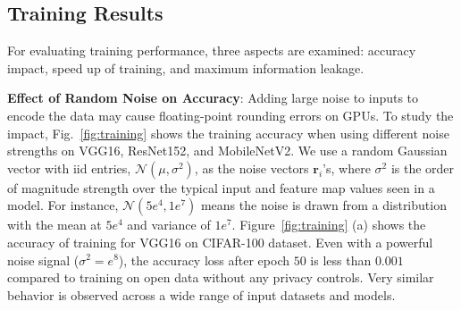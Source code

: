 \subsection{Training Results}
For evaluating training performance, three aspects are examined: accuracy impact, speed up of training, and maximum information leakage. 

\textbf{Effect of Random Noise on Accuracy}: Adding large noise to inputs to encode the data may cause floating-point rounding errors on GPUs. To study the impact, Fig.~\ref{fig:training} shows the training accuracy when using different noise strengths on VGG16, ResNet152, and MobileNetV2. 
We use a random Gaussian vector with iid entries, $\mathcal N(\mu,\sigma^2)$, as the noise vectors $\mathbf r_i$'s, where $\sigma^2$ is the order of magnitude strength over the typical input and feature map values seen in a model. For instance, $\mathcal N(5e^4,1e^7)$ means the noise is drawn from a distribution with the mean at $5e^4$ and variance of $1e^7$. Figure~\ref{fig:training} (a) shows the accuracy of training for VGG16 on CIFAR-100 dataset. Even with a powerful noise signal ($\sigma^2=e^8$), the accuracy loss after epoch $50$ is less than $0.001$ compared to training on open data without any privacy controls. Very similar behavior is observed across a wide range of input datasets and models.  

\begin{table*}[htbp]
\caption{Effect of different noise signals on the accuracy of DarKnight inference for different models on ImageNet}
 \vskip -0.1in
\label{tab:inferenceAcc}
 \vskip -0.1in
\end{table*}







